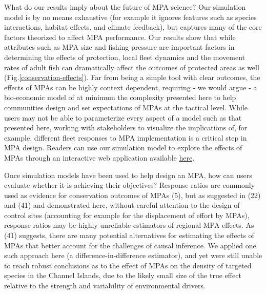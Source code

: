 \documentclass[9pt,twocolumn,twoside,lineno]{pnas-new}
\begin{document}
What do our results imply about the future of MPA science? Our
simulation model is by no means exhaustive (for example it ignores
features such as species interactions, habitat effects, and climate
feedback), but captures many of the core factors theorized to affect MPA
performance. Our results show that while attributes such as MPA size and
fishing pressure are important factors in determining the effects of
protection, local fleet dynamics and the movement rates of adult fish
can dramatically affect the outcomes of protected areas as well
(Fig.\ref{conservation-effects}). Far from being a simple tool with
clear outcomes, the effects of MPAs can be highly context dependent,
requiring - we would argue - a bio-economic model of at minimum the
complexity presented here to help communities design and set
expectations of MPAs at the tactical level. While users may not be able
to parameterize every aspect of a model such as that presented here,
working with stakeholders to visualize the implications of, for example,
different fleet responses to MPA implementation is a critical step in
MPA design. Readers can use our simulation model to explore the effects
of MPAs through an interactive web application available
\href{https://danovando.shinyapps.io/simmpa/}{here}.

Once simulation models have been used to help design an MPA, how can
users evaluate whether it is achieving their objectives? Response ratios
are commonly used as evidence for conservation outcomes of MPAs (5), but
as suggested in (22) and (41) and demonstrated here, without careful
attention to the design of control sites (accounting for example for the
displacement of effort by MPAs), response ratios may be highly
unreliable estimators of regional MPA effects. As (41) suggests, there
are many potential alternatives for estimating the effects of MPAs that
better account for the challenges of causal inference. We applied one
such approach here (a difference-in-difference estimator), and yet were
still unable to reach robust conclusions as to the effect of MPAs on the
density of targeted species in the Channel Islands, due to the likely
small size of the true effect relative to the strength and variability
of environmental drivers.
\end{document}
